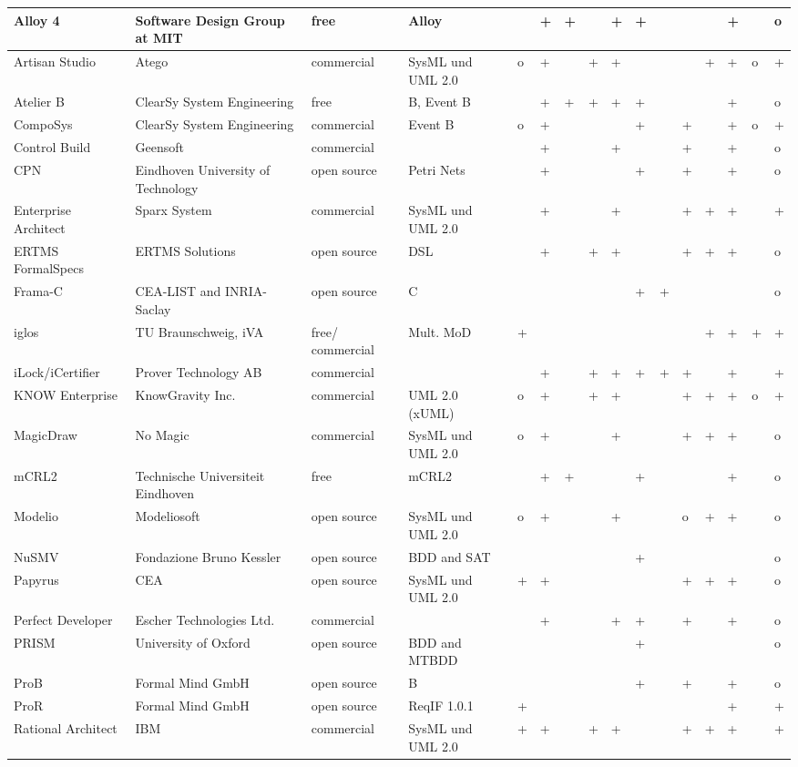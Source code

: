 \documentclass{./template/openetcs2}
\begin{document}
\begin{landscape}
\begin{center}
\begin{longtable}{|m{2.5cm}|p{3cm}|m{1.8cm}|p{3.5cm}||m{1.2cm}|m{0.2cm}|m{0.2cm}|m{0.2cm}|m{0.7cm}|m{0.2cm}|m{0.7cm}|m{0.2cm}|m{0.6cm}|m{1.2cm}|m{0.2cm}|m{0.2cm}|}
Alloy 4&Software Design Group at MIT&free &Alloy&&+&+&&+&+&&&&+&&o \\ \hline
Artisan Studio&Atego&commercial&SysML und UML 2.0&o&+&&+&+&&&&+&+&o&+ \\ \hline
Atelier B&ClearSy System Engineering&free &B, Event B&&+&+&+&+&+&&&&+&&o \\ \hline
CompoSys&ClearSy System Engineering&commercial&Event B&o&+&&&&+&&+&&+&o&+ \\ \hline
Control Build&Geensoft&commercial&&&+&&&+&&&+&&+&&o \\ \hline
CPN&Eindhoven University of Technology&open source&Petri Nets&&+&&&&+&&+&&+&&o \\ \hline
Enterprise Architect&Sparx System&commercial&SysML und UML 2.0&&+&&&+&&&+&+&+&&+ \\ \hline
ERTMS FormalSpecs&ERTMS Solutions&open source&DSL&&+&&+&+&&&+&+&+&&o \\ \hline
Frama-C&CEA-LIST and INRIA-Saclay&open source&C&&&&&&+&+&&&&&o \\ \hline
iglos&TU Braunschweig, iVA&free/ commercial&Mult. MoD&+&&&&&&&&+&+&+&+ \\ \hline
iLock/iCertifier&Prover Technology AB &commercial&&&+&&+&+&+&+&+&&+&&+ \\ \hline
KNOW Enterprise&KnowGravity Inc.&commercial&UML 2.0 (xUML)&o&+&&+&+&&&+&+&+&o&+ \\ \hline
MagicDraw&No Magic&commercial&SysML und UML 2.0&o&+&& &+&&&+&+&+&&o \\ \hline
mCRL2&Technische Universiteit Eindhoven&free&mCRL2&&+&+&&&+&&&&+&&o \\ \hline
Modelio&Modeliosoft&open source&SysML und UML 2.0&o&+&&&+&&&o&+&+&&o \\ \hline
NuSMV&Fondazione Bruno Kessler&open source&BDD and SAT&&&&&&+&&&&&&o \\ \hline
Papyrus&CEA&open source&SysML und UML 2.0&+&+&&&&&&+&+&+&&o \\ \hline
Perfect Developer&Escher Technologies Ltd.&commercial&&&+&&&+&+&&+&&+&&o \\ \hline
PRISM&University of Oxford&open source&BDD and MTBDD&&&&&&+&&&&&&o \\ \hline
ProB&Formal Mind GmbH&open source&B&&&&&&+&&+&&+&&o \\ \hline
ProR&Formal Mind GmbH&open source&ReqIF 1.0.1&+&&&&&&&&&+&&+ \\ \hline
Rational Architect&IBM&commercial&SysML und UML 2.0&+&+&&+&+&&&+&+&+&&+ \\ \hline

\end{longtable}
\end{center}
\end{landscape}
\end{document}

